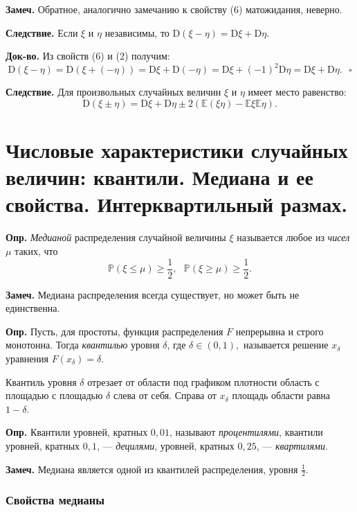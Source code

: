 \documentclass[oneside,final,14pt]{extreport}
\newcommand\mydef{{\bf Опр.}}
\newcommand\mynote{{\bf Замеч.}}
\newcommand\mycon{{\bf Следствие.}}
\newcommand\myqed{{\bf Док-во.}}
\newcommand\myprob[1]{{\mathbb{P}(#1)}}
\theoremstyle{definition}
\begin{document}
\begin{enumerate}
    \mynote{} Обратное, аналогично замечанию к свойству (6) матожидания, неверно.
    
    \mycon{} Если $\xi$ и $\eta$ независимы, то $\mathrm{D}(\xi-\eta)=\mathrm{D} \xi+\mathrm{D} \eta$. 
    
    \myqed{} Из свойств (6) и (2) получим: 
    $$\mathrm{D}(\xi-\eta)=\mathrm{D}(\xi+(-\eta))=\mathrm{D} \xi+\mathrm{D}(-\eta)=\mathrm{D} \xi+(-1)^{2} \mathrm{D} \eta=\mathrm{D} \xi+\mathrm{D} \eta. ~~~ \square$$
    
    \mycon{} Для произвольных случайных величин $\xi$ и $\eta$ имеет место равенство:
    $$\mathrm{D}(\xi \pm \eta)=\mathrm{D} \xi+\mathrm{D} \eta \pm 2(\mathbb{E}(\xi \eta)-\mathbb{E} \xi \mathbb{E} \eta).$$
    
\end{enumerate}

\section {Числовые характеристики случайных величин: квантили. Медиана и ее свойства. Интерквартильный размах.}

\mydef{} {\it Медианой} распределения случайной величины $\xi$ называется любое из {\it чисел} $\mu$ таких, что
$$\myprob{\xi \leqslant \mu} \geqslant \frac{1}{2}, ~~~ \myprob{\xi \geqslant \mu} \geqslant \frac{1}{2}.$$

\mynote{} Медиана распределения всегда существует, но может быть не единственна.

\mydef{} Пусть, для простоты, функция распределения $F$ непрерывна и строго монотонна. Тогда {\it квантилью} уровня $\delta$, где $\delta \in (0, 1), $ называется решение $x_\delta$ уравнения $F(x_\delta) = \delta.$ 

Квантиль уровня $\delta$ отрезает от области под графиком плотности область с площадью с площадью $\delta$ слева от себя. Справа от $x_\delta$ площадь области равна $1 - \delta$.

\mydef{} Квантили уровней, кратных $0,01$, называют {\it процентилями}, квантили уровней, кратных $0,1$, — {\it децилями}, уровней, кратных $0,25$, — {\it квартилями}.

\mynote{} Медиана является одной из квантилей распределения, уровня $\frac{1}{2}.$

\subsubsection{Свойства медианы}
\end{document}
